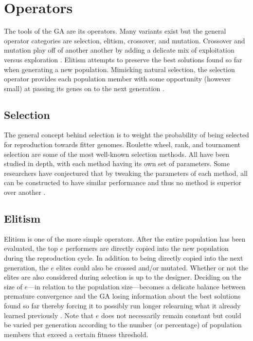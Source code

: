 \section{Operators}

The tools of the GA are its operators. Many variants exist but the general operator categories are selection, elitism, crossover, and mutation. Crossover and mutation play off of another another by adding a delicate mix of exploitation versus exploration \cite{Beasley93anoverview}. Elitism attempts to preserve the best solutions found so far when generating a new population. Mimicking natural selection, the selection operator provides each population member with some opportunity (however small) at passing its genes on to the next generation \cite{Beasley93anoverview}.      

\subsection{Selection}

The general concept behind selection is to weight the probability of being selected for reproduction towards fitter genomes. Roulette wheel, rank, and tournament selection are some of the most well-known selection methods. All have been studied in depth, with each method having its own set of parameters. Some researchers have conjectured that by tweaking the parameters of each method, all can be constructed to have similar performance and thus no method is superior over another \cite{Beasley93anoverview}.    

\subsection{Elitism}

Elitism is one of the more simple operators. After the entire population has been evaluated, the top $e$ performers are directly copied into the new population during the reproduction cycle. In addition to being directly copied into the next generation, the $e$ elites could also be crossed and/or mutated. Whether or not the elites are also considered during selection is up to the designer. Deciding on the size of $e$---in relation to the population size---becomes a delicate balance between premature convergence and the GA losing information about the best solutions found so far thereby forcing it to possibly run longer relearning what it already learned previously \cite{DanWDyer}. Note that $e$ does not necessarily remain constant but could be varied per generation according to the number (or percentage) of population members that exceed a certain fitness threshold. 

